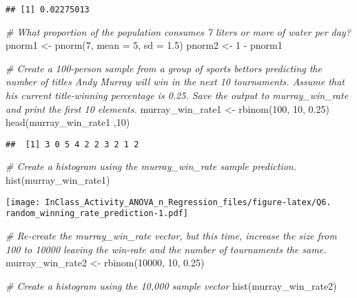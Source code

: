 \documentclass[
]{article}
\newenvironment{Shaded}{\begin{snugshade}}{\end{snugshade}}
\newcommand{\AttributeTok}[1]{\textcolor[rgb]{0.77,0.63,0.00}{#1}}
\newcommand{\CommentTok}[1]{\textcolor[rgb]{0.56,0.35,0.01}{\textit{#1}}}
\newcommand{\DecValTok}[1]{\textcolor[rgb]{0.00,0.00,0.81}{#1}}
\newcommand{\FloatTok}[1]{\textcolor[rgb]{0.00,0.00,0.81}{#1}}
\newcommand{\FunctionTok}[1]{\textcolor[rgb]{0.00,0.00,0.00}{#1}}
\newcommand{\NormalTok}[1]{#1}
\newcommand{\OtherTok}[1]{\textcolor[rgb]{0.56,0.35,0.01}{#1}}
\newcommand{\SpecialCharTok}[1]{\textcolor[rgb]{0.00,0.00,0.00}{#1}}
\begin{document}
\begin{verbatim}
## [1] 0.02275013
\end{verbatim}

\begin{Shaded}
\begin{Highlighting}[]
\CommentTok{\# What proportion of the population consumes 7 liters or more of water per day?}
\NormalTok{pnorm1 }\OtherTok{\textless{}{-}} \FunctionTok{pnorm}\NormalTok{(}\DecValTok{7}\NormalTok{, }\AttributeTok{mean =} \DecValTok{5}\NormalTok{, }\AttributeTok{sd =} \FloatTok{1.5}\NormalTok{)}
\NormalTok{pnorm2 }\OtherTok{\textless{}{-}} \DecValTok{1} \SpecialCharTok{{-}}\NormalTok{ pnorm1}
\end{Highlighting}
\end{Shaded}

\begin{Shaded}
\begin{Highlighting}[]
\CommentTok{\# Create a 100{-}person sample from a group of sports bettors predicting the number of titles Andy Murray will win in the next 10 tournaments. Assume that his current title{-}winning percentage is 0.25. Save the output to murray\_win\_rate and print the first 10 elements. }
\NormalTok{murray\_win\_rate1 }\OtherTok{\textless{}{-}} \FunctionTok{rbinom}\NormalTok{(}\DecValTok{100}\NormalTok{, }\DecValTok{10}\NormalTok{, }\FloatTok{0.25}\NormalTok{)}
\FunctionTok{head}\NormalTok{(murray\_win\_rate1 ,}\DecValTok{10}\NormalTok{)}
\end{Highlighting}
\end{Shaded}

\begin{verbatim}
##  [1] 3 0 5 4 2 2 3 2 1 2
\end{verbatim}

\begin{Shaded}
\begin{Highlighting}[]
\CommentTok{\# Create a histogram using the murray\_win\_rate sample prediction.}
\FunctionTok{hist}\NormalTok{(murray\_win\_rate1)}
\end{Highlighting}
\end{Shaded}

\texttt{[image: InClass\_Activity\_ANOVA\_n\_Regression\_files/figure-latex/Q6. random\_winning\_rate\_prediction-1.pdf]}

\begin{Shaded}
\begin{Highlighting}[]
\CommentTok{\# Re{-}create the murray\_win\_rate vector, but this time, increase the size from 100 to 10000 leaving the win{-}rate and the number of tournaments the same. }
\NormalTok{murray\_win\_rate2 }\OtherTok{\textless{}{-}} \FunctionTok{rbinom}\NormalTok{(}\DecValTok{10000}\NormalTok{, }\DecValTok{10}\NormalTok{, }\FloatTok{0.25}\NormalTok{)}

\CommentTok{\# Create a histogram using the 10,000 sample vector}
\FunctionTok{hist}\NormalTok{(murray\_win\_rate2)}
\end{Highlighting}
\end{Shaded}
\end{document}

